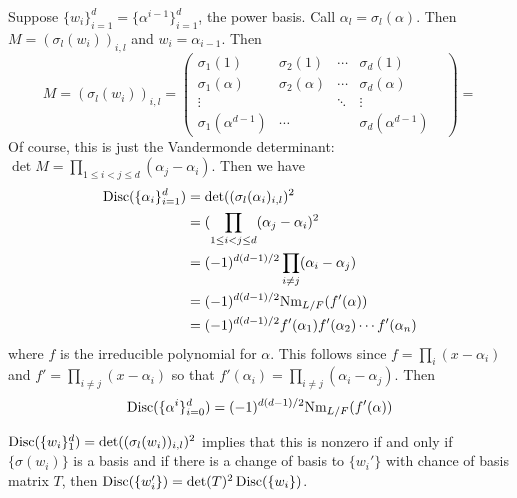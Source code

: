 \begin{ex}
Suppose $\{w_i\}_{i=1}^d= \{\alpha^{i-1}\}_{i=1}^d$, the power basis. Call $\alpha_l=\sigma_l(\alpha)$. Then $M=(\sigma_l(w_i))_{i,l}$ and $w_i=\alpha_{i-1}$. Then
	\[
	M=(\sigma_l(w_i))_{i,l}=
	\begin{pmatrix}
	\sigma_1(1) & \sigma_2(1) & \cdots & \sigma_d(1) \\
	\sigma_1(\alpha) & \sigma_2(\alpha) & \cdots & \sigma_d(\alpha) \\
	\vdots & & \ddots & \vdots & \\
	\sigma_1(\alpha^{d-1}) & \cdots & & \sigma_d(\alpha^{d-1})
	\end{pmatrix}=
	\]
Of course, this is just the Vandermonde determinant: $\det M= \prod_{1 \leq i < j \leq d} (\alpha_j-\alpha_i)$. Then we have
	\[
	\begin{split}
	\operatorname{Disc}(\{\alpha_i\}_{i=1}^d)&=\det((\sigma_l(\alpha_i)_{i,l})^2 \\
	&= (\prod_{1\leq i<j\leq d} (\alpha_j - \alpha_i )^2 \\
	&= (-1)^{d(d-1)/2} \prod_{i \neq j} (\alpha_i - \alpha_j) \\
	&= (-1)^{d(d-1)/2} \text{Nm}_{L/F}(f'(\alpha)) \\
	&=(-1)^{d(d-1)/2} f'(\alpha_1)f'(\alpha_2) \cdots f'(\alpha_n)
	\end{split}
	\]
where $f$ is the irreducible polynomial for $\alpha$. This follows since $f=\prod_i (x-\alpha_i)$ and $f'= \prod_{i \neq j} (x-\alpha_i)$ so that $f'(\alpha_i)= \prod_{i \neq j} (\alpha_i - \alpha_j)$. Then
	\[
	\operatorname{Disc}(\{\alpha^i\}_{i=0}^d)= (-1)^{d(d-1)/2} \text{Nm}_{L/F}(f'(\alpha)) 
	\]
\end{ex}

\begin{cor}
$\operatorname{Disc}(\{w_i\}_{1}^d)=\det((\sigma_l(w_i))_{i,l})^2$ implies that this is nonzero if and only if $\{\sigma(w_i)\}$ is a basis and if there is a change of basis to $\{w_i'\}$ with chance of basis matrix $T$, then $\operatorname{Disc}(\{w_i'\})= \det(T)^2 \operatorname{Disc}(\{w_i\})$. 
\end{cor}

